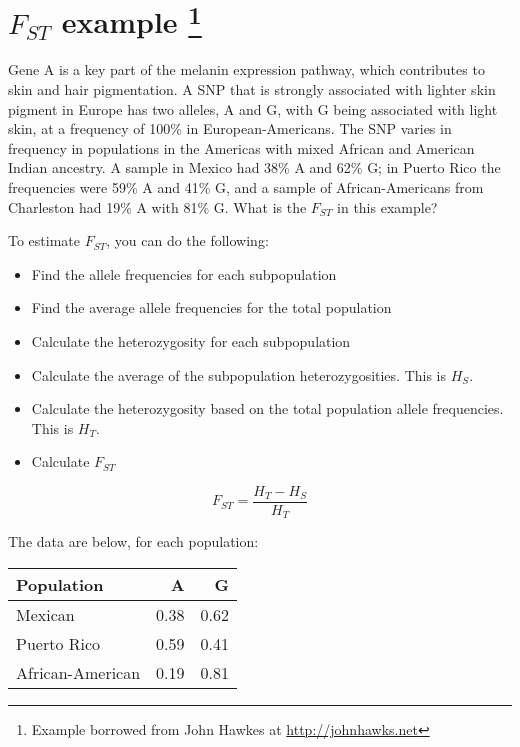 \documentclass[12pt]{article}
\begin{document}
\pagestyle{empty}

\section*{$F_{ST}$ example
\footnote{Example borrowed from John Hawkes at \url{http://johnhawks.net}}}

Gene A is a key part of
the melanin expression pathway, which
contributes to
skin and hair pigmentation. A SNP that is strongly associated with lighter skin
pigment in Europe has two alleles, A and G, with G being associated with light
skin, at a frequency of 100\% in European-Americans. The SNP varies in frequency
in populations in the Americas with mixed African and American Indian ancestry. A sample in Mexico had 38\% A and 62\% G; in Puerto Rico the frequencies were 59\% A and 41\% G, and a sample of African-Americans from Charleston had 19\% A with 81\% G. What is the $F_{ST}$ in this example?

\vspace{1em}

To estimate $F_{ST}$, you can do the following:

\begin{itemize}
\item{Find the allele frequencies for each subpopulation}
\item{Find the average allele frequencies for the total population}
\item{Calculate the heterozygosity for each subpopulation}
\item{Calculate the average of the subpopulation heterozygosities.  This is
$H_S$}.
\item{Calculate the heterozygosity based on the total population allele
frequencies.  This is $H_T$}.
\item{Calculate $F_{ST}$}
\end{itemize}

\begin{equation*}
F_{ST} = \frac{H_T-H_S}{H_T}
\end{equation*}

\vspace{1em}
The data are below, for each population:

\begin{table}[h]
\centering
\begin{tabular}{lrr}
Population &  A & G \\
\hline
Mexican & 0.38 & 0.62 \\
Puerto Rico & 0.59 & 0.41 \\
African-American & 0.19 & 0.81 \\
\hline
\end{tabular}
\end{table}
\end{document}
